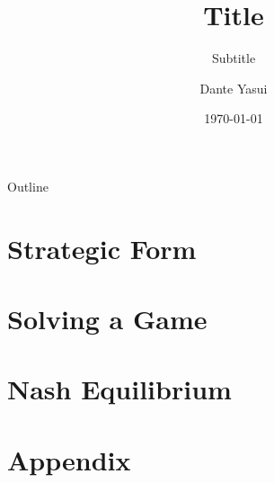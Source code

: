 \documentclass{beamer}
\title{Title}
\subtitle{Subtitle}
\author{Dante Yasui}
\institute{University of Oregon}
\date{\today}
\theoremstyle{plain}
\begin{document}
\begin{frame}[plain]
    \titlepage
\end{frame}
\addtocounter{framenumber}{-1}

\begin{frame}[plain]{Outline}
    \tableofcontents
\end{frame}
\addtocounter{framenumber}{-1}


\section{Strategic Form}

\section{Solving a Game}

\section{Nash Equilibrium}






\addtocounter{framenumber}{-1}

\section{Appendix}
\begin{frame}
    \tiny
    
\end{frame}

\end{document}
